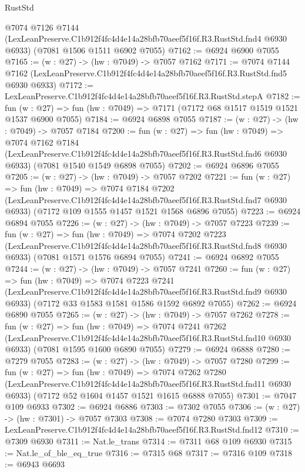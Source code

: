 \begin{lexlean}{RustStd}
\begin{coremodule}
  @7074
    @7126
    @7144
    (LexLeanPreserve.C1b912f4fc4d4e14a28bfb70aeef5f16f.R3.RustStd.fnd4 @6930 @6933)
    (@7081 @1506 @1511 @6902 @7055)
@7162 := @6924 @6900 @7055
@7165 := (w : @27) -> (hw : @7049) -> @7057 @7162
@7171 := @7074
    @7144
    @7162
    (LexLeanPreserve.C1b912f4fc4d4e14a28bfb70aeef5f16f.R3.RustStd.fnd5 @6930 @6933)
@7172 := LexLeanPreserve.C1b912f4fc4d4e14a28bfb70aeef5f16f.R3.RustStd.stepA
@7182 := fun (w : @27) => fun (hw : @7049) => @7171 (@7172 @68 @1517 @1519 @1521 @1537 @6900 @7055)
@7184 := @6924 @6898 @7055
@7187 := (w : @27) -> (hw : @7049) -> @7057 @7184
@7200 := fun (w : @27) =>
  fun (hw : @7049) =>
  @7074
    @7162
    @7184
    (LexLeanPreserve.C1b912f4fc4d4e14a28bfb70aeef5f16f.R3.RustStd.fnd6 @6930 @6933)
    (@7081 @1540 @1549 @6898 @7055)
@7202 := @6924 @6896 @7055
@7205 := (w : @27) -> (hw : @7049) -> @7057 @7202
@7221 := fun (w : @27) =>
  fun (hw : @7049) =>
  @7074
    @7184
    @7202
    (LexLeanPreserve.C1b912f4fc4d4e14a28bfb70aeef5f16f.R3.RustStd.fnd7 @6930 @6933)
    (@7172 @109 @1555 @1457 @1521 @1568 @6896 @7055)
@7223 := @6924 @6894 @7055
@7226 := (w : @27) -> (hw : @7049) -> @7057 @7223
@7239 := fun (w : @27) =>
  fun (hw : @7049) =>
  @7074
    @7202
    @7223
    (LexLeanPreserve.C1b912f4fc4d4e14a28bfb70aeef5f16f.R3.RustStd.fnd8 @6930 @6933)
    (@7081 @1571 @1576 @6894 @7055)
@7241 := @6924 @6892 @7055
@7244 := (w : @27) -> (hw : @7049) -> @7057 @7241
@7260 := fun (w : @27) =>
  fun (hw : @7049) =>
  @7074
    @7223
    @7241
    (LexLeanPreserve.C1b912f4fc4d4e14a28bfb70aeef5f16f.R3.RustStd.fnd9 @6930 @6933)
    (@7172 @33 @1583 @1581 @1586 @1592 @6892 @7055)
@7262 := @6924 @6890 @7055
@7265 := (w : @27) -> (hw : @7049) -> @7057 @7262
@7278 := fun (w : @27) =>
  fun (hw : @7049) =>
  @7074
    @7241
    @7262
    (LexLeanPreserve.C1b912f4fc4d4e14a28bfb70aeef5f16f.R3.RustStd.fnd10 @6930 @6933)
    (@7081 @1595 @1600 @6890 @7055)
@7279 := @6924 @6888
@7280 := @7279 @7055
@7283 := (w : @27) -> (hw : @7049) -> @7057 @7280
@7299 := fun (w : @27) =>
  fun (hw : @7049) =>
  @7074
    @7262
    @7280
    (LexLeanPreserve.C1b912f4fc4d4e14a28bfb70aeef5f16f.R3.RustStd.fnd11 @6930 @6933)
    (@7172 @52 @1604 @1457 @1521 @1615 @6888 @7055)
@7301 := @7047 @109 @6933
@7302 := @6924 @6886
@7303 := @7302 @7055
@7306 := (w : @27) -> (hw : @7301) -> @7057 @7303
@7308 := @7074 @7280 @7303
@7309 := LexLeanPreserve.C1b912f4fc4d4e14a28bfb70aeef5f16f.R3.RustStd.fnd12
@7310 := @7309 @6930
@7311 := Nat.le_trans
@7314 := @7311 @68 @109 @6930
@7315 := Nat.le_of_ble_eq_true
@7316 := @7315 @68
@7317 := @7316 @109
@7318 := @6943 @6693

\end{coremodule}
\end{lexlean}
